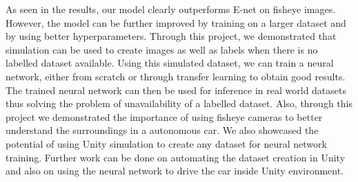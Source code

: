\documentclass[a4paper, 12pt, oneside, BCOR1cm,toc=chapterentrywithdots]{scrbook}
\begin{document}
As seen in the results, our model clearly outperforms E-net on fisheye images. However, the model can be further improved by training on a larger dataset and by using better hyperparameters. Through this project, we demonstrated that simulation can be used to create images as well as labels when there is no labelled dataset available. Using this simulated dataset, we can train a neural network, either from scratch or through transfer learning to obtain good results. The trained neural network can then be used for inference in real world datasets thus solving the problem of unavailability of a labelled dataset. Also, through this project we demonstrated the importance of using fisheye cameras to better understand the surroundings in a autonomous car. We also showcased the potential of using Unity simulation to create any dataset for neural network training. Further work can be done on automating the dataset creation in Unity and also on using the neural network to drive the car inside Unity environment.





\printindex
\end{document}
